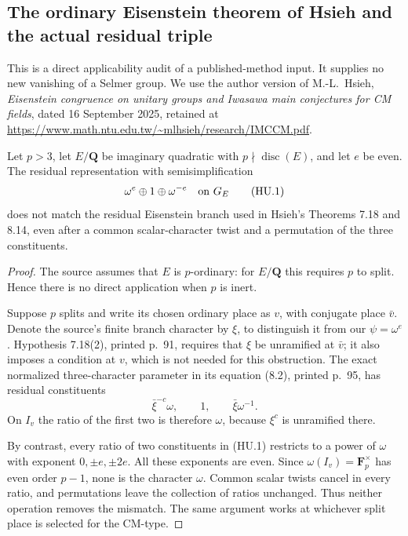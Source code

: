 \subsection{The ordinary Eisenstein theorem of Hsieh and the actual residual triple}
\label{sec:kt-hsieh-unitary-scope}

This is a direct applicability audit of a published-method input.
It supplies no new vanishing of a Selmer group.  We use the author
version of M.-L.~Hsieh, \emph{Eisenstein congruence on unitary groups
and Iwasawa main conjectures for CM fields}, dated
16 September 2025, retained at
\url{https://www.math.ntu.edu.tw/~mlhsieh/research/IMCCM.pdf}.

\begin{proposition}
Let $p>3$, let $E/\mathbf Q$ be imaginary quadratic with
$p\nmid\operatorname{disc}(E)$, and let $e$ be even.
The residual representation with semisimplification
\[
       \omega^e\oplus1\oplus\omega^{-e}\quad\hbox{on }G_E
       \tag{HU.1}
\]
does not match the residual Eisenstein branch used in Hsieh's
Theorems 7.18 and 8.14, even after a common scalar-character
twist and a permutation of the three constituents.
\end{proposition}
\begin{proof}
The source assumes that $E$ is $p$-ordinary: for $E/\mathbf Q$
this requires $p$ to split.  Hence there is no direct application
when $p$ is inert.

Suppose $p$ splits and write its chosen ordinary place as $v$,
with conjugate place $\bar v$.  Denote the source's finite branch
character by $\xi$, to distinguish it from our $\psi=\omega^e$.
Hypothesis 7.18(2), printed p.~91, requires that $\xi$ be
unramified at $\bar v$; it also imposes a condition at $v$,
which is not needed for this obstruction.  The exact normalized
three-character parameter in its equation (8.2), printed p.~95,
has residual constituents
\[
       \bar\xi^{-c}\omega,\qquad 1,\qquad
       \bar\xi\omega^{-1}.
       \tag{HU.2}
\]
On $I_v$ the ratio of the first two is therefore $\omega$,
because $\xi^c$ is unramified there.

By contrast, every ratio of two constituents in (HU.1)
restricts to a power of $\omega$ with exponent
$0,\pm e,\pm2e$.  All these exponents are even.
Since $\omega(I_v)=\mathbf F_p^\times$ has even order $p-1$,
none is the character $\omega$.  Common scalar twists cancel
in every ratio, and permutations leave the collection of ratios
unchanged.  Thus neither operation removes the mismatch.
The same argument works at whichever split place is selected
for the CM-type.
\end{proof}

